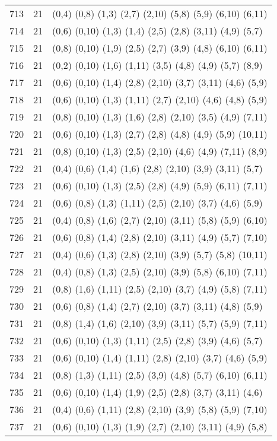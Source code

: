 {\begin{longtable}{lll}
713 & 21 & (0,4) (0,8) (1,3) (2,7) (2,10) (5,8) (5,9) (6,10) (6,11) \\
714 & 21 & (0,6) (0,10) (1,3) (1,4) (2,5) (2,8) (3,11) (4,9) (5,7) \\
715 & 21 & (0,8) (0,10) (1,9) (2,5) (2,7) (3,9) (4,8) (6,10) (6,11) \\
716 & 21 & (0,2) (0,10) (1,6) (1,11) (3,5) (4,8) (4,9) (5,7) (8,9) \\
717 & 21 & (0,6) (0,10) (1,4) (2,8) (2,10) (3,7) (3,11) (4,6) (5,9) \\
718 & 21 & (0,6) (0,10) (1,3) (1,11) (2,7) (2,10) (4,6) (4,8) (5,9) \\
719 & 21 & (0,8) (0,10) (1,3) (1,6) (2,8) (2,10) (3,5) (4,9) (7,11) \\
720 & 21 & (0,6) (0,10) (1,3) (2,7) (2,8) (4,8) (4,9) (5,9) (10,11) \\
721 & 21 & (0,8) (0,10) (1,3) (2,5) (2,10) (4,6) (4,9) (7,11) (8,9) \\
722 & 21 & (0,4) (0,6) (1,4) (1,6) (2,8) (2,10) (3,9) (3,11) (5,7) \\
723 & 21 & (0,6) (0,10) (1,3) (2,5) (2,8) (4,9) (5,9) (6,11) (7,11) \\
724 & 21 & (0,6) (0,8) (1,3) (1,11) (2,5) (2,10) (3,7) (4,6) (5,9) \\
725 & 21 & (0,4) (0,8) (1,6) (2,7) (2,10) (3,11) (5,8) (5,9) (6,10) \\
726 & 21 & (0,6) (0,8) (1,4) (2,8) (2,10) (3,11) (4,9) (5,7) (7,10) \\
727 & 21 & (0,4) (0,6) (1,3) (2,8) (2,10) (3,9) (5,7) (5,8) (10,11) \\
728 & 21 & (0,4) (0,8) (1,3) (2,5) (2,10) (3,9) (5,8) (6,10) (7,11) \\
729 & 21 & (0,8) (1,6) (1,11) (2,5) (2,10) (3,7) (4,9) (5,8) (7,11) \\
730 & 21 & (0,6) (0,8) (1,4) (2,7) (2,10) (3,7) (3,11) (4,8) (5,9) \\
731 & 21 & (0,8) (1,4) (1,6) (2,10) (3,9) (3,11) (5,7) (5,9) (7,11) \\
732 & 21 & (0,6) (0,10) (1,3) (1,11) (2,5) (2,8) (3,9) (4,6) (5,7) \\
733 & 21 & (0,6) (0,10) (1,4) (1,11) (2,8) (2,10) (3,7) (4,6) (5,9) \\
734 & 21 & (0,8) (1,3) (1,11) (2,5) (3,9) (4,8) (5,7) (6,10) (6,11) \\
735 & 21 & (0,6) (0,10) (1,4) (1,9) (2,5) (2,8) (3,7) (3,11) (4,6) \\
736 & 21 & (0,4) (0,6) (1,11) (2,8) (2,10) (3,9) (5,8) (5,9) (7,10) \\
737 & 21 & (0,6) (0,10) (1,3) (1,9) (2,7) (2,10) (3,11) (4,9) (5,8) \\
\end{longtable}}



